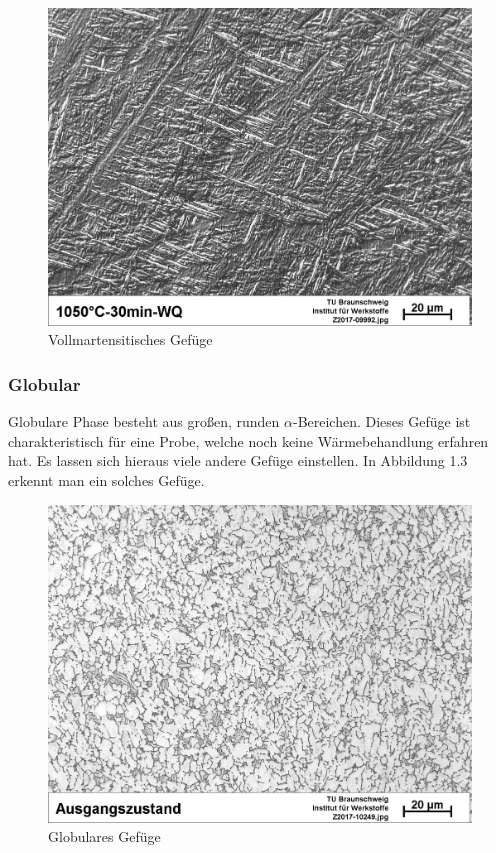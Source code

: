 \documentclass[a4paper, 11pt]{tubsreprt}
\begin{document}
\begin{figure}
\centering
\includegraphics[scale=0.5]{Bilder/Vollmartensit.jpg}
\caption{Vollmartensitisches Gefüge}
\label{fig3}
\end{figure}
\subsubsection{Globular}
Globulare Phase besteht aus großen, runden $\alpha$-Bereichen. Dieses Gefüge ist charakteristisch für eine Probe, welche noch keine Wärmebehandlung erfahren hat. Es lassen sich hieraus viele andere Gefüge einstellen. In Abbildung 1.3 erkennt man ein solches Gefüge. 
\begin{figure}
\centering
\includegraphics[scale=0.6]{Bilder/Ausgangsgefuege.jpg}
\caption{Globulares Gefüge}
\label{fig4}
\end{figure}
\end{document}
